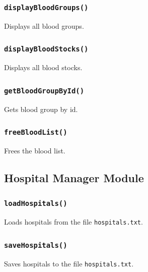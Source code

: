\documentclass[12pt,a4paper]{report}
\begin{document}
\subsubsection{\texttt{displayBloodGroups()}}
Displays all blood groups.


\subsubsection{\texttt{displayBloodStocks()}}
Displays all blood stocks.


\subsubsection{\texttt{getBloodGroupById()}}
Gets blood group by id.


\subsubsection{\texttt{freeBloodList()}}
Frees the blood list.


\subsection{Hospital Manager Module}
\subsubsection{\texttt{loadHospitals()}}
Loads hospitals from the file \texttt{hospitals.txt}.


\subsubsection{\texttt{saveHospitals()}}
Saves hospitals to the file \texttt{hospitals.txt}.

\end{document}
